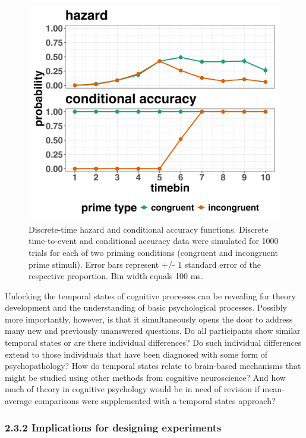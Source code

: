 \documentclass[
  man, donotrepeattitle,floatsintext]{apa6}
\begin{document}
\begin{figure}[H]

{\centering \includegraphics[width=0.8\linewidth,height=0.67\textheight,]{../sims/figures/haz_acc_single} 

}

\caption{Discrete-time hazard and conditional accuracy functions. Discrete time-to-event and conditional accuracy data were simulated for 1000 trials for each of two priming conditions (congruent and incongruent prime stimuli). Error bars represent +/- 1 standard error of the respective proportion. Bin width equals 100 ms.}\label{fig:plot3}
\end{figure}

Unlocking the temporal states of cognitive processes can be revealing for theory development and the understanding of basic psychological processes. Possibly more importantly, however, is that it simultaneously opens the door to address many new and previously unanswered questions. Do all participants show similar temporal states or are there individual differences? Do such individual differences extend to those individuals that have been diagnosed with some form of psychopathology? How do temporal states relate to brain-based mechanisms that might be studied using other methods from cognitive neuroscience? And how much of theory in cognitive psychology would be in need of revision if mean-average comparisons were supplemented with a temporal states approach?

\subsubsection{2.3.2 Implications for designing experiments}\label{implications-for-designing-experiments}
\end{document}
